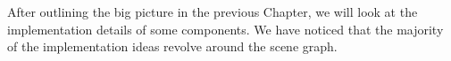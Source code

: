 After outlining the big picture in the previous Chapter, we will look at the implementation details of some components. We have noticed that the majority of the implementation ideas revolve around the scene graph.
